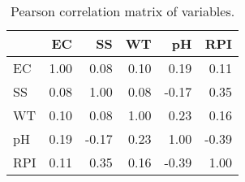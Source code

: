\begin{table}
\centering
\caption{Pearson correlation matrix of variables.}
\label{tab:corr_matrix}
\begin{tabular}{lrrrrr}
\toprule
{} &   EC &    SS &   WT &    pH &   RPI \\
\midrule
EC  & 1.00 &  0.08 & 0.10 &  0.19 &  0.11 \\
SS  & 0.08 &  1.00 & 0.08 & -0.17 &  0.35 \\
WT  & 0.10 &  0.08 & 1.00 &  0.23 &  0.16 \\
pH  & 0.19 & -0.17 & 0.23 &  1.00 & -0.39 \\
RPI & 0.11 &  0.35 & 0.16 & -0.39 &  1.00 \\
\bottomrule
\end{tabular}
\end{table}
